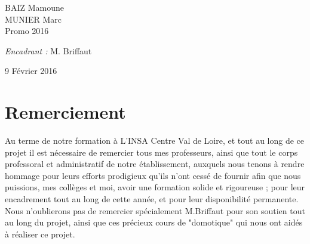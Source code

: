 {\begin{titlepage}
\begin{sffamily}
\begin{center}
    \begin{minipage}{0.4\textwidth}
      \begin{flushleft} \large
        BAIZ Mamoune \\ MUNIER Marc \\
        Promo 2016\\
      \end{flushleft}
    \end{minipage}
    \begin{minipage}{0.4\textwidth}
      \begin{flushright} \large
        \emph{Encadrant :} M. Briffaut\\
      \end{flushright}
    \end{minipage}

    \vfill

    {\large 9 Février 2016}

  \end{center}
  \end{sffamily}
\end{titlepage}
}
\newpage
\newpage
\clearpage


\newpage
\section*{Remerciement}
Au terme de notre formation à L’INSA Centre Val de Loire, et tout au long de ce projet il est nécessaire de remercier tous mes professeurs, ainsi que tout le corps professoral et administratif de notre établissement, auxquels nous tenons à rendre hommage pour leurs efforts prodigieux qu’ils n’ont cessé de fournir afin que nous puissions, mes collèges et moi, avoir une formation solide et rigoureuse ; pour leur encadrement tout au long de cette année, et pour leur disponibilité permanente. Nous n’oublierons pas de remercier spécialement M.Briffaut pour son soutien tout au long du projet, ainsi que ces précieux cours de "domotique" qui nous ont aidés à réaliser ce projet.\newline



